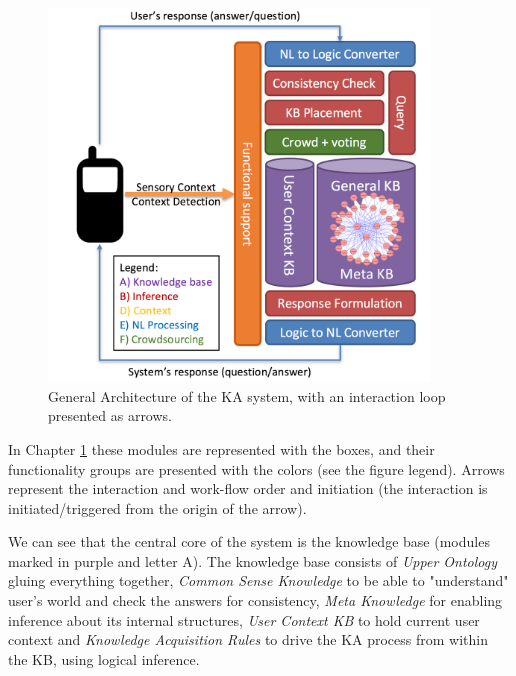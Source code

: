 \begin{figure}[htb]
	\centering
		\includegraphics[width=0.9\textwidth]{figures/architecture.png}
	\caption{General Architecture of the KA system, with an interaction loop
			 presented as arrows.}
	\label{fig:Architecture}
\end{figure}

In Chapter \ref{fig:Architecture} these modules are represented with the boxes,
and their functionality groups are presented with the colors (see the figure
legend). Arrows represent the interaction and work-flow order and initiation 
(the interaction is initiated/triggered from the origin of the arrow).

We can see that the central core of the
system is the knowledge base (modules marked in purple and letter A). The 
knowledge base consists of \emph{Upper Ontology} gluing everything together, 
\emph{Common Sense Knowledge} to be able to "understand" user's world and check
the answers for consistency, \emph{Meta Knowledge} for enabling inference about 
its internal structures, \emph{User Context KB} to hold current user context and 
\emph{Knowledge Acquisition Rules} to drive the KA process from within the KB, 
using logical inference. 

